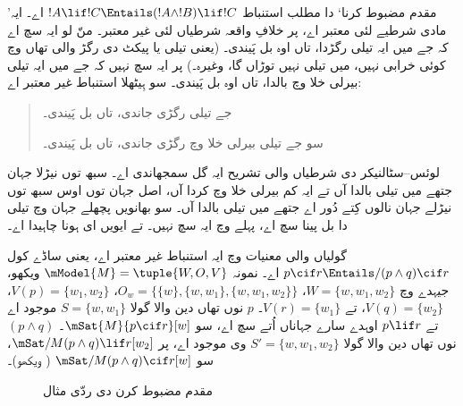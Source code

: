 \documentclass[../../../include/open-logic-section]{subfiles}
\begin{document}


’مقدم مضبوط کرنا‘ دا مطلب استنباط $!A \lif !C \Entails (!A \land !B) \lif !C$
اے۔ ایہ مادی شرطیے لئی معتبر اے، پر خلافِ واقعہ شرطیاں لئی غیر معتبر۔
منّ لو ایہ سچ اے کہ جے میں ایہ تیلی رگڑدا، تاں اوہ بل پَیندی۔ (یعنی تیلی
یا پیکٹ دی رگڑ والی تھاں وچ کوئی خرابی نہیں، میں تیلی نہیں توڑاں گا، وغیرہ۔)
پر ایہ سچ نہیں کہ جے میں ایہ تیلی بیرلی خلا وچ بالدا، تاں اوہ بل پَیندی۔
سو ہِیٹھلا استنباط غیر معتبر اے:
\begin{quote}
  جے تیلی رگڑی جاندی، تاں بل پَیندی۔

  سو جے تیلی بیرلی خلا وچ رگڑی جاندی، تاں بل پَیندی۔
\end{quote}

لوئس--سٹالنیکر دی شرطیاں والی تشریح ایہ گل سمجھاندی اے۔ سبھ توں نیڑلا
جہان جتھے میں تیلی بالدا آں تے ایہ کم بیرلی خلا وچ کردا آں، اصل جہان توں
اوس سبھ توں نیڑلے جہان نالوں کِتے دُور اے جتھے میں تیلی بالدا آں۔ سو
بھانویں پچھلے جہان وچ تیلی دا بل پینا سچ اے، پہلے وچ ایہ سچ نہیں۔
تے ایویں ای ہونا چاہیدا اے۔

\begin{ex}
  گولیاں والی معنیات وچ ایہ استنباط غیر معتبر اے، یعنی ساڈے کول $p
  \cif r \Entails/ (p \land q) \cif r$ اے۔ نمونہ $\mModel{M}
  = \tuple{W, O, V}$ ویکھو، جیہدے وچ $W = \{w, w_1, w_2\}$،
  $O_w = \{\{w\}, \{w, w_1\}, \{w, w_1, w_2\}\}$، $V(p) = \{w_1, w_2\}$،
  $V(q) = \{w_2\}$، تے $V(r) = \{w_1\}$۔ $p$ نوں تھاں دین والا گولا
  $S = \{w, w_1\}$ موجود اے تے $p \lif r$ اوہدے سارے جہاناں اُتے سچ اے،
  سو $\mSat{M}{p \cif r}[w]$۔ $(p \land q)$ نوں تھاں دین والا گولا
  $S' = \{w, w_1, w_2\}$ وی موجود اے، پر $\mSat/{M}{(p \land q) \lif r}[w_2]$،
  سو $\mSat/{M}{(p \land q) \cif r}[w]$ ( ویکھو)۔

\begin{figure}
\begin{center}
\caption{مقدم مضبوط کرن دی ردّی مثال}
\end{center}
\end{figure}
\end{ex}
\end{document}
